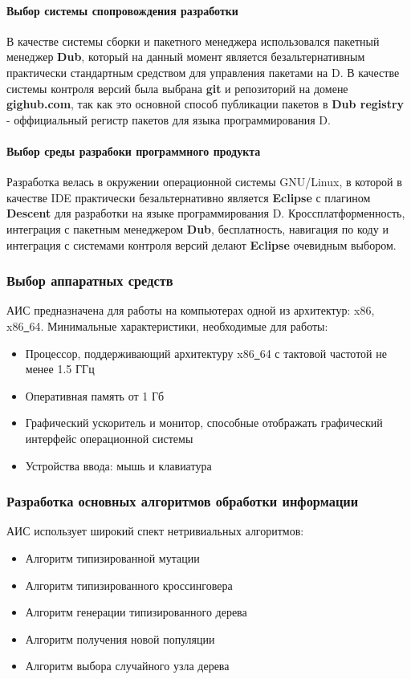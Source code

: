 \documentclass[russian,utf8,emptystyle]{eskdtext}
\begin{document}
\begin{spacing}{1.5}
\paragraph{Выбор системы спопровождения разработки}
В качестве системы сборки и пакетного менеджера использовался пакетный менеджер \textbf{Dub}, который на данный момент является безальтернативным практически стандартным средством для управления пакетами на D. В качестве системы контроля версий была выбрана \textbf{git} и репозиторий на домене \textbf{gighub.com}, так как это основной способ публикации пакетов в \textbf{Dub registry} - оффициальный регистр пакетов для языка программирования D.

\paragraph{Выбор среды разрабоки программного продукта}
Разработка велась в окружении операционной системы GNU/Linux, в которой в качестве IDE практически безальтернативно является \textbf{Eclipse} с плагином \textbf{Descent} для разработки на языке программирования D. Кроссплатформенность, интеграция с пакетным менеджером \textbf{Dub}, бесплатность, навигация по коду и интеграция с системами контроля версий делают \textbf{Eclipse} очевидным выбором. 

\subsubsection{Выбор аппаратных средств}
АИС предназначена для работы на компьютерах одной из архитектур: x86, x86\underline{~}64. Минимальные характеристики, необходимые для работы:
\begin{itemize}
\item Процессор, поддерживающий архитектуру x86\underline{~}64 с тактовой частотой не менее 1.5 ГГц
\item Оперативная память от 1 Гб
\item Графический ускоритель и монитор, способные отображать графический интерфейс операционной системы
\item Устройства ввода: мышь и клавиатура
\end{itemize}

\subsubsection{Разработка основных алгоритмов обработки информации}
АИС использует широкий спект нетривиальных алгоритмов:
\begin{itemize}
\item Алгоритм типизированной мутации
\item Алгоритм типизированного кроссинговера
\item Алгоритм генерации типизированного дерева
\item Алгоритм получения новой популяции
\item Алгоритм выбора случайного узла дерева
\end{itemize}


\end{spacing}
\end{document}
